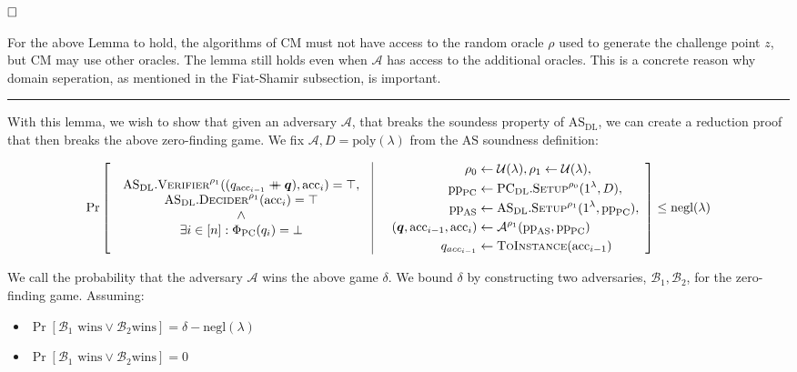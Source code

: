 \documentclass[
]{article}
\providecommand{\tightlist}{%
  \setlength{\itemsep}{0pt}\setlength{\parskip}{0pt}}
\newcommand*\Ac{\mathcal{A}}
\newcommand*\Bc{\mathcal{B}}
\newcommand*\Uc{\mathcal{U}}
\renewcommand*\d{\delta}
\renewcommand*\l{\lambda}
\newcommand*\cat{\mathbin{+\mkern-10mu+}}
\newcommand{\qed}{\hfill \ensuremath{\Box}}
\renewcommand{\vec}[1]{ \boldsymbol{#1} }
\newcommand*{\negl}{\text{negl}}
\newcommand*{\poly}{\text{poly}}
\newcommand*{\pp}{\mathrm{pp}}
\newcommand*{\acc}{\mathrm{acc}}
\newcommand*{\ToInstance}{\mathrm{\text{T\scriptsize O}\text{I\scriptsize NSTANCE}}}
\newcommand*{\Setup}{\mathrm{\text{S{\scriptsize ETUP}}}}
\newcommand*{\AS}{\text{AS}}
\newcommand*{\PC}{\text{PC}}
\newcommand*{\PCDL}{\text{PC}_{\text{DL}}}
\newcommand*{\PCDLSetup}{\PCDL.\Setup}
\newcommand*{\ASDL}{\text{AS}_{\text{DL}}}
\newcommand*{\ASDLSetup}{\ASDL.\Setup}
\newcommand*{\ASDLVerifier}{\ASDL.\mathrm{\text{V\scriptsize ERIFIER}}}
\newcommand*{\ASDLDecider}{\ASDL.\mathrm{\text{D\scriptsize ECIDER}}}
\newcommand*{\CM}{\mathrm{\text{CM}}}
\begin{document}
\(\qed\)

For the above Lemma to hold, the algorithms of \(\CM\) must not have
access to the random oracle \(\rho\) used to generate the challenge
point \(z\), but \(\CM\) may use other oracles. The lemma still holds
even when \(\Ac\) has access to the additional oracles. This is a
concrete reason why domain seperation, as mentioned in the Fiat-Shamir
subsection, is important.

\begin{center}\rule{0.5\linewidth}{0.5pt}\end{center}

With this lemma, we wish to show that given an adversary \(\Ac\), that
breaks the soundess property of \(\ASDL\), we can create a reduction
proof that then breaks the above zero-finding game. We fix
\(\Ac, D = \poly(\l)\) from the \(\AS\) soundness definition:

\[
\Pr \left[
  \begin{array}{c|c}
    \begin{array}{c}
      \ASDLVerifier^{\rho_1}((q_{\acc_{i-1}} \cat \vec{q}), \acc_i) = \top, \\
      \ASDLDecider^{\rho_1}(\acc_i) = \top \\
      \land \\
      \exists i \in [n] : \Phi_{\PC}(q_i) = \bot
    \end{array}
  & \quad
    \begin{aligned}
      \rho_0 &\leftarrow \Uc(\l), \rho_1 \leftarrow \Uc(\l), \\
      \pp_\PC &\leftarrow \PCDLSetup^{\rho_0}(1^\l, D), \\
      \pp_\AS &\leftarrow \ASDLSetup^{\rho_1}(1^\l, \pp_\PC), \\
      (\vec{q}, \acc_{i-1}, \acc_i) &\leftarrow \Ac^{\rho_1}(\pp_\AS, \pp_\PC) \\
      q_{acc_{i-1}} &\leftarrow \ToInstance(\acc_{i-1}) \\
    \end{aligned}
  \end{array}
\right] \leq \negl(\l)
\]

We call the probability that the adversary \(\Ac\) wins the above game
\(\d\). We bound \(\d\) by constructing two adversaries,
\(\Bc_1, \Bc_2\), for the zero-finding game. Assuming:

\begin{itemize}
\tightlist
\item
  \(\Pr[\Bc_1 \text{ wins} \lor \Bc_2 \text{wins}] = \delta - \negl(\l)\)
\item
  \(\Pr[\Bc_1 \text{ wins} \lor \Bc_2 \text{wins}] = 0\)
\end{itemize}
\end{document}
